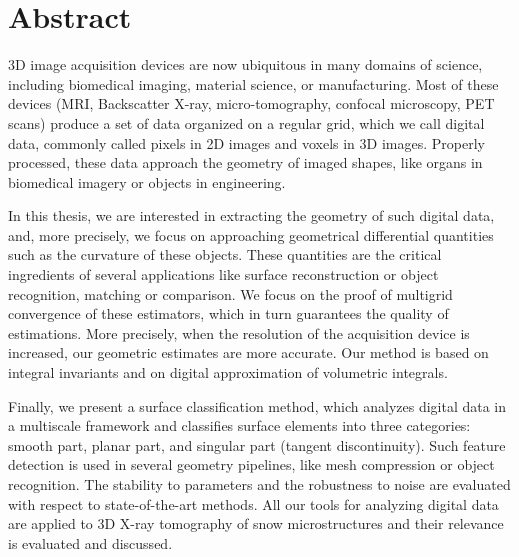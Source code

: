 %
%
%
\chapter*{Abstract}
\label{sec:abstract}
\vspace*{-10mm}

3D image acquisition devices are now ubiquitous in many domains of science,
including biomedical imaging, material science, or manufacturing. Most of these
devices (MRI, Backscatter X-ray, micro-tomography, confocal microscopy, PET scans)
produce a set of data organized on a regular grid, which we call digital data,
commonly called pixels in 2D images and voxels in 3D images. Properly processed,
these data approach the geometry of imaged shapes, like organs in biomedical
imagery or objects in engineering.

In this thesis, we are interested in extracting the geometry of such digital
data, and, more precisely, we focus on approaching geometrical differential
quantities such as the curvature of these objects. These quantities are the
critical ingredients of several applications like surface reconstruction or
object recognition, matching or comparison. We focus on the proof of multigrid
convergence of these estimators, which in turn guarantees the quality of
estimations. More precisely, when the resolution of the acquisition device is
increased, our geometric estimates are more accurate. Our method is based on
integral invariants and on digital approximation of volumetric integrals.

Finally, we present a surface classification method, which analyzes digital data
in a multiscale framework and classifies surface elements into three categories:
smooth part, planar part, and singular part (tangent discontinuity). Such
feature detection is used in several geometry pipelines, like mesh compression
or object recognition. The stability to parameters and the robustness to noise
are evaluated with respect to state-of-the-art methods. All our tools for
analyzing digital data are applied to 3D X-ray tomography of snow
microstructures and their relevance is evaluated and discussed.

\vspace*{20mm}


